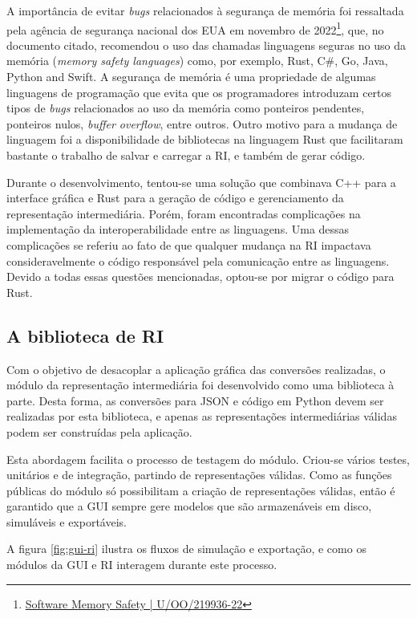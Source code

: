 \documentclass[
	12pt,				%
	openright,			%
	oneside,			%
	a4paper,			%
	main=brazil,
	english,			%
	]{ufsj-abntex2}
\begin{document}
A importância de evitar \textit{bugs} relacionados à segurança de memória foi ressaltada pela agência de segurança nacional dos EUA em novembro de 2022\footnote{\href{https://media.defense.gov/2022/Nov/10/2003112742/-1/-1/0/CSI_SOFTWARE_MEMORY_SAFETY.PDF}{Software Memory Safety | U/OO/219936-22}}, que, no documento citado, recomendou o uso das chamadas linguagens seguras no uso da memória (\textit{memory safety languages}) como, por exemplo, Rust, C\#, Go, Java, Python and Swift. A segurança de memória é uma propriedade de algumas linguagens de programação que evita que os programadores introduzam certos tipos de \textit{bugs} relacionados ao uso da memória como ponteiros pendentes, ponteiros nulos, \textit{buffer overflow}, entre outros. Outro motivo para a mudança de linguagem foi a disponibilidade de bibliotecas na linguagem Rust que facilitaram bastante o trabalho de salvar e carregar a RI, e também de gerar código. 

Durante o desenvolvimento, tentou-se uma solução que combinava C++ para a interface gráfica e Rust para a geração de código e gerenciamento da representação intermediária. Porém, foram encontradas complicações na implementação da interoperabilidade entre as linguagens. Uma dessas complicações se referiu ao fato de que qualquer mudança na RI impactava consideravelmente o código responsável pela comunicação entre as linguagens. Devido a todas essas questões mencionadas, optou-se por migrar o código para Rust. 


\subsection{A biblioteca de RI}
\label{sub:ri}

Com o objetivo de desacoplar a aplicação gráfica das conversões realizadas, o módulo da representação intermediária foi desenvolvido como uma biblioteca à parte. Desta forma, as conversões para JSON e código em Python devem ser realizadas por esta biblioteca, e apenas as representações intermediárias válidas podem ser construídas pela aplicação.

Esta abordagem facilita o processo de testagem do módulo. Criou-se vários testes, unitários e de integração, partindo de representações válidas. Como as funções públicas do módulo só possibilitam a criação de representações válidas, então é garantido que a GUI sempre gere modelos que são armazenáveis em disco, simuláveis e exportáveis.

A figura \ref{fig:gui-ri} ilustra os fluxos de simulação e exportação, e como os módulos da GUI e RI interagem durante este processo.
\end{document}
